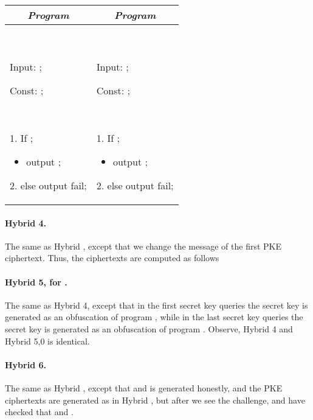 \documentclass{llncs}
\begin{document}
\begin{center}
\begin{small}
    \begin{tabular}{| p{6cm} | p{6cm} |}
	\hline
	\multicolumn{1}{|c|}{\textbf{\emph{Program} }} & \multicolumn{1}{|c|}{\textbf{\emph{Program} }}\\
	\hline 
	\
	
	Input: ; 
	
	Const: ;
	
	\

	1. If ;
	\begin{itemize}
		\item[] output ;
	\end{itemize}

	2. else output fail;

	&
	\

	Input: ; 
	
	Const: ;
	
	\

	1. If ;
	\begin{itemize}
		\item[] output ;
	\end{itemize}

	2. else output fail;

	\\
	\hline
	\end{tabular}
\end{small}
\end{center}

\paragraph{Hybrid 4.} The same as Hybrid , except that we change the message of the first PKE ciphertext. Thus, the ciphertexts are computed as follows
	

\paragraph{Hybrid 5, for .} The same as Hybrid 4, except that in the first  secret key queries the secret key is generated as an obfuscation of program , while in the last  secret key queries the secret key is generated as an obfuscation of program .
Observe, Hybrid 4 and Hybrid 5,0 is identical.

\paragraph{Hybrid 6.} The same as Hybrid , except that  and  is generated honestly, and the PKE ciphertexts are generated as in  Hybrid , but after we see the challenge, and have checked that  and . \\
\end{document}
